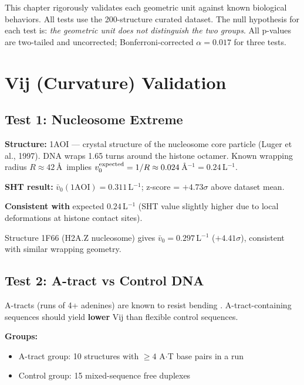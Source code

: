 

This chapter rigorously validates each geometric unit against known biological behaviors. All tests use the 200-structure curated dataset. The null hypothesis for each test is: \textit{the geometric unit does not distinguish the two groups}. All p-values are two-tailed and uncorrected; Bonferroni-corrected $\alpha = 0.017$ for three tests.

\section{Vij (Curvature) Validation}

\subsection{Test 1: Nucleosome Extreme}

\textbf{Structure:} 1AOI --- crystal structure of the nucleosome core particle (Luger et al., 1997). DNA wraps 1.65 turns around the histone octamer. Known wrapping radius $R \approx 42$\,\AA\ implies $v_0^{\rm expected} = 1/R \approx 0.024$\,\AA$^{-1} = 0.24$\,L$^{-1}$.

\begin{keyresult}
    \textbf{SHT result:} $\bar{v}_0(1\text{AOI}) = 0.311$\,L$^{-1}$; z-score = $+4.73\sigma$ above dataset mean.
    
    \textbf{Consistent with} expected $0.24$\,L$^{-1}$ (SHT value slightly higher due to local deformations at histone contact sites).
\end{keyresult}

Structure 1F66 (H2A.Z nucleosome) gives $\bar{v}_0 = 0.297$\,L$^{-1}$ ($+4.41\sigma$), consistent with similar wrapping geometry.

\subsection{Test 2: A-tract vs Control DNA}

A-tracts (runs of 4+ adenines) are known to resist bending \citep{Koo1986,Hagerman1990}. A-tract-containing sequences should yield \textbf{lower} Vij than flexible control sequences.

\textbf{Groups:}
\begin{itemize}
    \item A-tract group: 10 structures with $\geq 4$ A$\cdot$T base pairs in a run
    \item Control group: 15 mixed-sequence free duplexes
\end{itemize}

